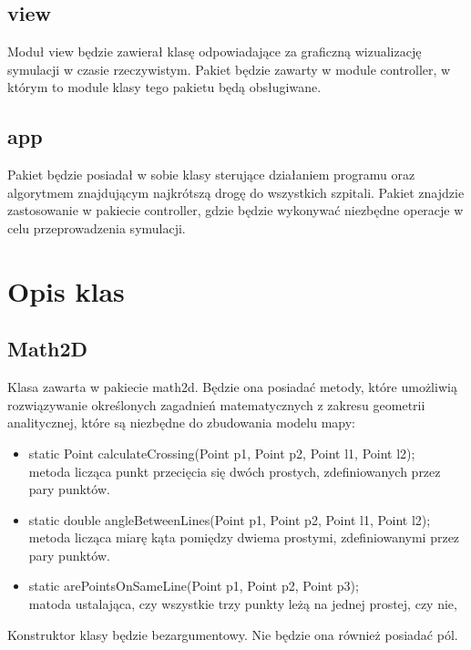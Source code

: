 \documentclass{article}
\begin{document}
    \subsection{view}
    Moduł view będzie zawierał klasę odpowiadające za graficzną wizualizację symulacji w czasie rzeczywistym. Pakiet będzie zawarty w module controller, w którym to module klasy tego pakietu będą obsługiwane.

    \subsection{app}
    Pakiet będzie posiadał w sobie klasy sterujące działaniem programu oraz algorytmem znajdującym najkrótszą drogę do wszystkich szpitali. Pakiet znajdzie zastosowanie w pakiecie controller, gdzie będzie wykonywać niezbędne operacje w celu przeprowadzenia symulacji.



\section{Opis klas}
    \subsection{Math2D}
    Klasa zawarta w pakiecie math2d. Będzie ona posiadać metody, które umożliwią rozwiązywanie określonych zagadnień matematycznych z zakresu geometrii analitycznej, które są niezbędne do zbudowania modelu mapy:
    \begin{itemize}
        \item static Point calculateCrossing(Point p1, Point p2, Point l1, Point l2); \\
        metoda licząca punkt przecięcia się dwóch prostych, zdefiniowanych przez pary punktów.

        \item static double angleBetweenLines(Point p1, Point p2, Point l1, Point l2); \\
        metoda licząca miarę kąta pomiędzy dwiema prostymi, zdefiniowanymi przez pary punktów.

        \item static arePointsOnSameLine(Point p1, Point p2, Point p3); \\
        matoda ustalająca, czy wszystkie trzy punkty leżą na jednej prostej, czy nie,

    \end{itemize}
    Konstruktor klasy będzie bezargumentowy. Nie będzie ona również posiadać pól.
\end{document}
